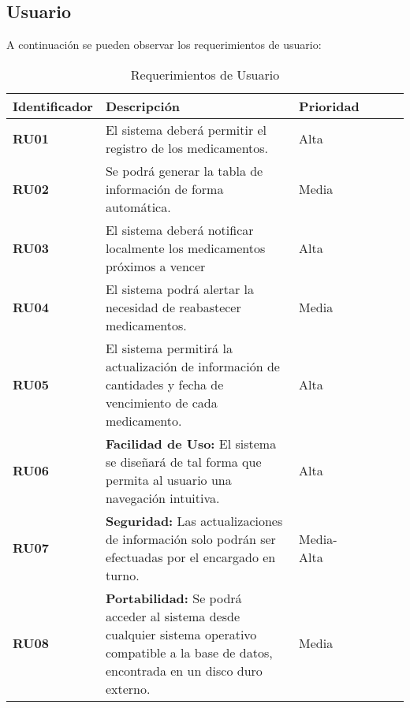 \subsection{Usuario}
A continuación se pueden observar los requerimientos de usuario: \\
\begin{table}[h!]
	\begin{center}
		\begin{tabular}{| l |p{9cm} | l |p{13cm} | c |p{9cm}|} 
			\hline
			\textbf{Identificador} & \textbf{Descripci\'on} & \textbf{Prioridad} \\
			\hline
			\textbf{RU01} & El sistema deberá permitir el registro de los medicamentos. & Alta\\ \hline
			\textbf{RU02} & Se podrá generar la tabla de información de forma automática. & Media\\ \hline
			\textbf{RU03} & El sistema deberá notificar localmente los medicamentos próximos a vencer & Alta\\ \hline
			\textbf{RU04} & El sistema podrá alertar la necesidad de reabastecer medicamentos. & Media\\ \hline
			\textbf{RU05} & El sistema permitirá la actualización de información de cantidades y fecha de vencimiento de cada medicamento. & Alta\\ \hline
			\textbf{RU06} & \textbf{Facilidad de Uso: } El sistema se diseñará de tal forma que permita al usuario una navegación intuitiva. & Alta\\ \hline
			\textbf{RU07} & \textbf{Seguridad: } Las actualizaciones de información solo podrán ser efectuadas por el encargado en turno. & Media-Alta\\ \hline
			\textbf{RU08} & \textbf{Portabilidad:} Se podrá acceder al sistema desde cualquier sistema operativo compatible a la base de datos, encontrada en un disco duro externo. & Media\\ \hline
		\end{tabular}
		\caption{Requerimientos de Usuario}
		\label{reqUsu}
	\end{center}
\end{table}
